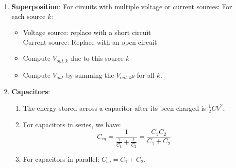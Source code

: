 \documentclass[10pt]{article}
\begin{document}
\begin{multicols}{2}
\begin{enumerate}
    \item \textbf{Superposition}: For circuits with multiple voltage or current sources: For each source $k$:
    \begin{itemize}
        \item 
            Voltage source: replace with a short circuit \\
            Current source: Replace with an open circuit

        \item Compute $V_{out,k}$ due to this source $k$
        \item Compute $V_{out}$ by summing the $V_{out,k}$s for all $k$.
    \end{itemize}
    
    \item \textbf{Capacitors}:\\
    \begin{enumerate}
        \item The energy stored across a capacitor after its been charged is $\frac{1}{2}CV^2$.
        \item For capacitors in series, we have: $$C_{eq}=\dfrac{1}{\frac{1}{C_1} + \frac{1}{C_2}} = \dfrac{C_1C_2}{C_1+C_2}$$
        \item For capacitors in parallel: $C_{eq} = C_1 + C_2$.
    \end{enumerate}
    

\end{enumerate}
\end{multicols}
\end{document}
